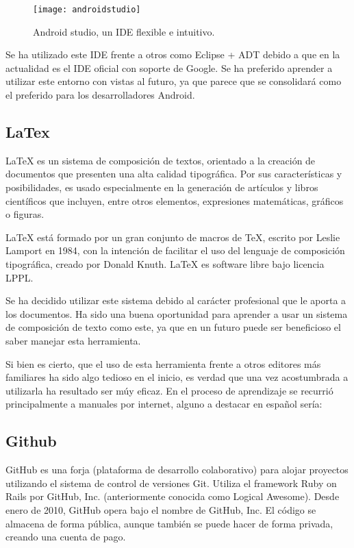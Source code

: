 \begin{figure}[h]
	\centering
	\texttt{[image: androidstudio]}
	\caption{Android studio, un IDE flexible e intuitivo.}
	\label{fig:androidstudio}
\end{figure}

Se ha utilizado este IDE frente a otros como Eclipse + ADT \cite{URL::eclipseADT} debido a que en la actualidad es el IDE oficial con soporte de Google. Se ha preferido aprender a utilizar este entorno con vistas al futuro, ya que parece que se consolidará como el preferido para los desarrolladores Android.

\subsection{LaTex}

LaTeX \cite{URL::LaTeX} es un sistema de composición de textos, orientado a la creación de documentos que presenten una alta calidad tipográfica. Por sus características y posibilidades, es usado especialmente en la generación de artículos y libros científicos que incluyen, entre otros elementos, expresiones matemáticas, gráficos o figuras.


LaTeX está formado por un gran conjunto de macros de TeX, escrito por Leslie Lamport en 1984, con la intención de facilitar el uso del lenguaje de composición tipográfica, creado por Donald Knuth. LaTeX es software libre bajo licencia LPPL.


Se ha decidido utilizar este sistema debido al carácter profesional que le aporta a los documentos. Ha sido una buena oportunidad para aprender a usar un sistema de composición de texto como este, ya que en un futuro puede ser beneficioso el saber manejar esta herramienta. 


Si bien es cierto, que el uso de esta herramienta frente a otros editores más familiares ha sido algo tedioso en el inicio, es verdad que una vez acostumbrada a utilizarla ha resultado ser múy eficaz. En el proceso de aprendizaje se recurrió principalmente a manuales por internet, alguno a destacar en español sería:  \cite{URL::manualLatex}

\subsection{Github}

GitHub es una forja (plataforma de desarrollo colaborativo) para alojar proyectos utilizando el sistema de control de versiones Git. Utiliza el framework Ruby on Rails por GitHub, Inc. (anteriormente conocida como Logical Awesome). Desde enero de 2010, GitHub opera bajo el nombre de GitHub, Inc. El código se almacena de forma pública, aunque también se puede hacer de forma privada, creando una cuenta de pago.


